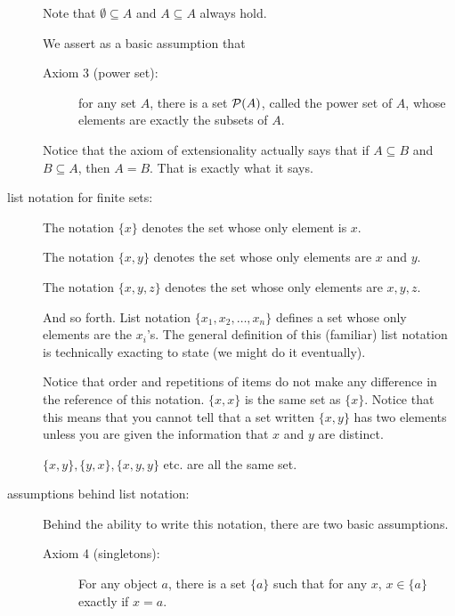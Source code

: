 \documentclass[12pt]{article}
\begin{document}
\begin{description}
Note that $\emptyset \subseteq A$ and $A \subseteq A$ always hold.

We assert as a basic assumption that 

\begin{description}

\item[Axiom 3 (power set):]  for any set $A$, there is a set ${\cal P}(A)$, called the power set of $A$, whose elements are exactly the subsets of $A$.

\end{description}

Notice that the axiom of extensionality actually says that if $A \subseteq B$ and $B \subseteq A$, then $A = B$.   That is exactly what it says.


\item[list notation for finite sets:]  The notation $\{x\}$ denotes the set whose only element is $x$.

The notation $\{x,y\}$ denotes the set whose only elements are $x$ and $y$.

The notation $\{x,y,z\}$ denotes the set whose only elements are $x,y,z$.

And so forth.  List notation $\{x_1,x_2,\ldots,x_n\}$ defines a set whose only elements are the $x_i$'s.
The general definition of this (familiar) list notation is technically exacting to state (we might do it eventually).

Notice that order and repetitions of items do not make any difference in the reference of this notation.
$\{x,x\}$ is the same set as $\{x\}$.  Notice that this means that you cannot tell that a set written $\{x,y\}$ has two elements unless you are given the information that $x$ and $y$ are distinct.

$\{x,y\}, \{y,x\}, \{x,y,y\}$ etc. are all the same set.

\item[assumptions behind list notation:]

Behind the ability to write this notation, there are two basic assumptions.

\begin{description}

\item[Axiom 4 (singletons):]  For any object $a$, there is a set $\{a\}$ such that for any $x$, $x \in \{a\}$ exactly if $x=a$.

\end{description}


\end{description}
\end{document}
